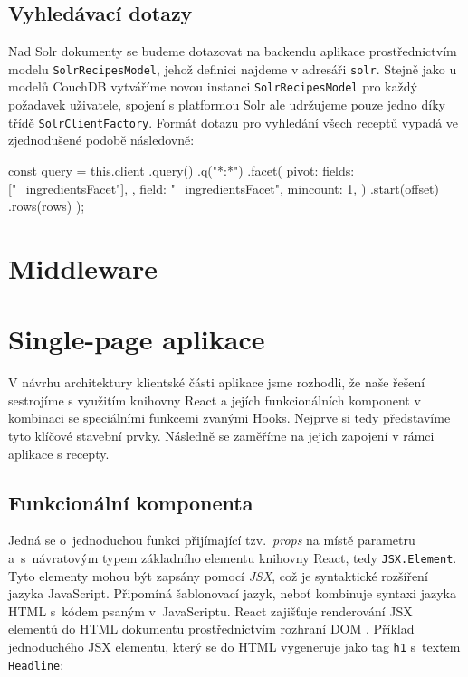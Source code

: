 \subsection{Vyhledávací dotazy}

Nad Solr dokumenty se budeme dotazovat na backendu aplikace prostřednictvím modelu \texttt{SolrRecipesModel}, jehož definici najdeme v adresáři \texttt{solr}. Stejně jako u modelů CouchDB vytváříme novou instanci \texttt{SolrRecipesModel} pro každý požadavek uživatele, spojení s platformou Solr ale udržujeme pouze jedno díky třídě \texttt{SolrClientFactory}. Formát dotazu pro vyhledání všech receptů vypadá ve zjednodušené podobě následovně:
\begingroup
\samepage
\begin{code}
const query = this.client
  .query()
  .q("*:*")
  .facet({
    pivot: {
      fields: ["_ingredientsFacet"],
    },
    field: "_ingredientsFacet",
    mincount: 1,
  })
  .start(offset)
  .rows(rows)
);
\end{code}
\endgroup


\section{Middleware}


\section{Single-page aplikace}

V návrhu architektury klientské části aplikace jsme rozhodli, že naše řešení sestrojíme s využitím knihovny React a jejích funkcionálních komponent v kombinaci se speciálními funkcemi zvanými Hooks. Nejprve si tedy představíme tyto klíčové stavební prvky. Následně se zaměříme na jejich zapojení v rámci aplikace s recepty.

\subsection{Funkcionální komponenta}

Jedná se o~jednoduchou funkci přijímající tzv.~\emph{props} na místě parametru a~s~návratovým typem základního elementu knihovny React, tedy \texttt{JSX.Element}. Tyto elementy mohou být zapsány pomocí \emph{JSX}, což je syntaktické rozšíření jazyka JavaScript. Připomíná šablonovací jazyk, neboť kombinuje syntaxi jazyka HTML s~kódem psaným v~JavaScriptu. React zajišťuje renderování JSX elementů do HTML dokumentu prostřednictvím rozhraní DOM \citep{jsx-intro}. Příklad jednoduchého JSX elementu, který se do HTML vygeneruje jako tag \texttt{h1} s~textem \texttt{Headline}:

